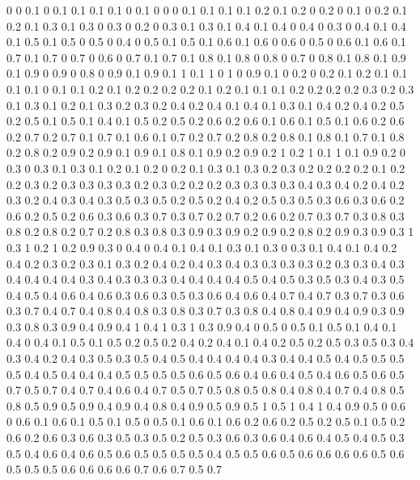 0 0
0.1 0
0.1 0.1
0.1 0.1
0 0.1
0 0
0 0.1
0.1 0.1
0.1 0.2
0.1 0.2
0 0.2
0 0.1
0 0.2
0.1 0.2
0.1 0.3
0.1 0.3
0 0.3
0 0.2
0 0.3
0.1 0.3
0.1 0.4
0.1 0.4
0 0.4
0 0.3
0 0.4
0.1 0.4
0.1 0.5
0.1 0.5
0 0.5
0 0.4
0 0.5
0.1 0.5
0.1 0.6
0.1 0.6
0 0.6
0 0.5
0 0.6
0.1 0.6
0.1 0.7
0.1 0.7
0 0.7
0 0.6
0 0.7
0.1 0.7
0.1 0.8
0.1 0.8
0 0.8
0 0.7
0 0.8
0.1 0.8
0.1 0.9
0.1 0.9
0 0.9
0 0.8
0 0.9
0.1 0.9
0.1 1
0.1 1
0 1
0 0.9
0.1 0
0.2 0
0.2 0.1
0.2 0.1
0.1 0.1
0.1 0
0.1 0.1
0.2 0.1
0.2 0.2
0.2 0.2
0.1 0.2
0.1 0.1
0.1 0.2
0.2 0.2
0.2 0.3
0.2 0.3
0.1 0.3
0.1 0.2
0.1 0.3
0.2 0.3
0.2 0.4
0.2 0.4
0.1 0.4
0.1 0.3
0.1 0.4
0.2 0.4
0.2 0.5
0.2 0.5
0.1 0.5
0.1 0.4
0.1 0.5
0.2 0.5
0.2 0.6
0.2 0.6
0.1 0.6
0.1 0.5
0.1 0.6
0.2 0.6
0.2 0.7
0.2 0.7
0.1 0.7
0.1 0.6
0.1 0.7
0.2 0.7
0.2 0.8
0.2 0.8
0.1 0.8
0.1 0.7
0.1 0.8
0.2 0.8
0.2 0.9
0.2 0.9
0.1 0.9
0.1 0.8
0.1 0.9
0.2 0.9
0.2 1
0.2 1
0.1 1
0.1 0.9
0.2 0
0.3 0
0.3 0.1
0.3 0.1
0.2 0.1
0.2 0
0.2 0.1
0.3 0.1
0.3 0.2
0.3 0.2
0.2 0.2
0.2 0.1
0.2 0.2
0.3 0.2
0.3 0.3
0.3 0.3
0.2 0.3
0.2 0.2
0.2 0.3
0.3 0.3
0.3 0.4
0.3 0.4
0.2 0.4
0.2 0.3
0.2 0.4
0.3 0.4
0.3 0.5
0.3 0.5
0.2 0.5
0.2 0.4
0.2 0.5
0.3 0.5
0.3 0.6
0.3 0.6
0.2 0.6
0.2 0.5
0.2 0.6
0.3 0.6
0.3 0.7
0.3 0.7
0.2 0.7
0.2 0.6
0.2 0.7
0.3 0.7
0.3 0.8
0.3 0.8
0.2 0.8
0.2 0.7
0.2 0.8
0.3 0.8
0.3 0.9
0.3 0.9
0.2 0.9
0.2 0.8
0.2 0.9
0.3 0.9
0.3 1
0.3 1
0.2 1
0.2 0.9
0.3 0
0.4 0
0.4 0.1
0.4 0.1
0.3 0.1
0.3 0
0.3 0.1
0.4 0.1
0.4 0.2
0.4 0.2
0.3 0.2
0.3 0.1
0.3 0.2
0.4 0.2
0.4 0.3
0.4 0.3
0.3 0.3
0.3 0.2
0.3 0.3
0.4 0.3
0.4 0.4
0.4 0.4
0.3 0.4
0.3 0.3
0.3 0.4
0.4 0.4
0.4 0.5
0.4 0.5
0.3 0.5
0.3 0.4
0.3 0.5
0.4 0.5
0.4 0.6
0.4 0.6
0.3 0.6
0.3 0.5
0.3 0.6
0.4 0.6
0.4 0.7
0.4 0.7
0.3 0.7
0.3 0.6
0.3 0.7
0.4 0.7
0.4 0.8
0.4 0.8
0.3 0.8
0.3 0.7
0.3 0.8
0.4 0.8
0.4 0.9
0.4 0.9
0.3 0.9
0.3 0.8
0.3 0.9
0.4 0.9
0.4 1
0.4 1
0.3 1
0.3 0.9
0.4 0
0.5 0
0.5 0.1
0.5 0.1
0.4 0.1
0.4 0
0.4 0.1
0.5 0.1
0.5 0.2
0.5 0.2
0.4 0.2
0.4 0.1
0.4 0.2
0.5 0.2
0.5 0.3
0.5 0.3
0.4 0.3
0.4 0.2
0.4 0.3
0.5 0.3
0.5 0.4
0.5 0.4
0.4 0.4
0.4 0.3
0.4 0.4
0.5 0.4
0.5 0.5
0.5 0.5
0.4 0.5
0.4 0.4
0.4 0.5
0.5 0.5
0.5 0.6
0.5 0.6
0.4 0.6
0.4 0.5
0.4 0.6
0.5 0.6
0.5 0.7
0.5 0.7
0.4 0.7
0.4 0.6
0.4 0.7
0.5 0.7
0.5 0.8
0.5 0.8
0.4 0.8
0.4 0.7
0.4 0.8
0.5 0.8
0.5 0.9
0.5 0.9
0.4 0.9
0.4 0.8
0.4 0.9
0.5 0.9
0.5 1
0.5 1
0.4 1
0.4 0.9
0.5 0
0.6 0
0.6 0.1
0.6 0.1
0.5 0.1
0.5 0
0.5 0.1
0.6 0.1
0.6 0.2
0.6 0.2
0.5 0.2
0.5 0.1
0.5 0.2
0.6 0.2
0.6 0.3
0.6 0.3
0.5 0.3
0.5 0.2
0.5 0.3
0.6 0.3
0.6 0.4
0.6 0.4
0.5 0.4
0.5 0.3
0.5 0.4
0.6 0.4
0.6 0.5
0.6 0.5
0.5 0.5
0.5 0.4
0.5 0.5
0.6 0.5
0.6 0.6
0.6 0.6
0.5 0.6
0.5 0.5
0.5 0.6
0.6 0.6
0.6 0.7
0.6 0.7
0.5 0.7
